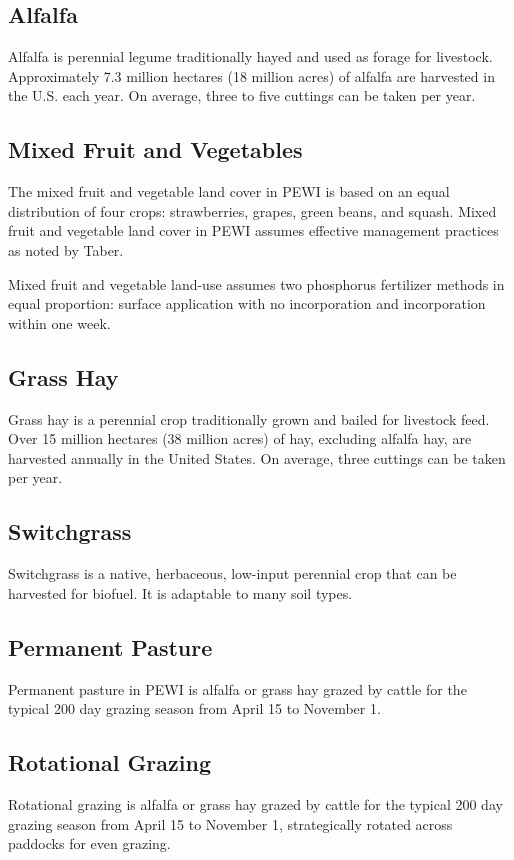 \documentclass[11pt]{article}
\begin{document}
\subsection{Alfalfa}
Alfalfa is perennial legume traditionally hayed and used as forage for livestock. Approximately 7.3 million hectares (18 million acres) of alfalfa are harvested in the U.S. each year\cite{5}.  On average, three to five cuttings can be taken per year.\cite{6}

\subsection{Mixed Fruit and Vegetables}
The mixed fruit and vegetable land cover in PEWI is based on an equal distribution of four crops: strawberries, grapes, green beans, and squash. Mixed fruit and vegetable land cover in PEWI assumes effective management practices as noted by Taber.\cite{7}

Mixed fruit and vegetable land-use assumes two phosphorus fertilizer methods in equal proportion: surface application with no incorporation and incorporation within one week.\cite{8} 

\subsection{Grass Hay}
Grass hay is a perennial crop traditionally grown and bailed for livestock feed. Over 15 million hectares (38 million acres) of hay, excluding alfalfa hay, are harvested annually in the United States. On average, three cuttings can be taken per year.\cite{9} 

\subsection{Switchgrass}
Switchgrass is a native, herbaceous, low-input perennial crop that can be harvested for biofuel. It is adaptable to many soil types.

\subsection{Permanent Pasture}
Permanent pasture in PEWI is alfalfa or grass hay grazed by cattle for the typical 200 day grazing season from April 15 to November 1.\cite{10}

\subsection{Rotational Grazing}
Rotational grazing is alfalfa or grass hay grazed by cattle for the typical 200 day grazing season from April 15 to November 1, strategically rotated across paddocks for even grazing.\cite{11}
\end{document}
